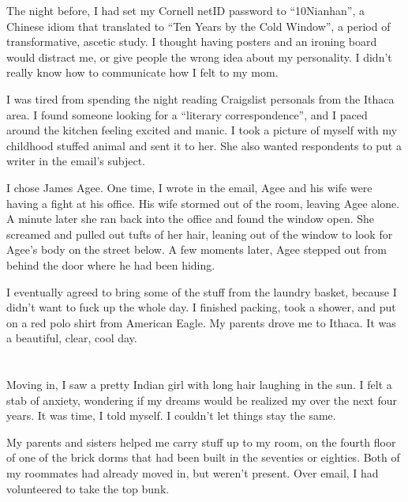 The night before, I had set my Cornell netID password to ``10Nianhan'', a
Chinese idiom that translated to ``Ten Years by the Cold Window'', a period of
transformative, ascetic study.  I thought having posters and an ironing board
would distract me, or give people the wrong idea about my personality.  I didn't
really know how to communicate how I felt to my mom.

I was tired from spending the night reading Craigslist personals from the Ithaca
area.  I found someone looking for a ``literary correspondence'', and I paced
around the kitchen feeling excited and manic.  I took a picture of myself with
my childhood stuffed animal and sent it to her.  She also wanted respondents to
put a writer in the email's subject.

I chose James Agee.  One time, I wrote in the email, Agee and his wife were
having a fight at his office.  His wife stormed out of the room, leaving Agee
alone.  A minute later she ran back into the office and found the window open.
She screamed and pulled out tufts of her hair, leaning out of the window to look
for Agee's body on the street below.  A few moments later, Agee stepped out from
behind the door where he had been hiding.

I eventually agreed to bring some of the stuff from the laundry basket, because
I didn't want to fuck up the whole day.  I finished packing, took a shower, and
put on a red polo shirt from American Eagle.  My parents drove me to Ithaca.  It
was a beautiful, clear, cool day.  

\section{}

Moving in, I saw a pretty Indian girl with long hair laughing in the sun.  I
felt a stab of anxiety, wondering if my dreams would be realized my over the
next four years.  It was time, I told myself.  I couldn't let things stay the
same.

My parents and sisters helped me carry stuff up to my room, on the fourth floor
of one of the brick dorms that had been built in the seventies or eighties.
Both of my roommates had already moved in, but weren't present.  Over email, I
had volunteered to take the top bunk.

\section{}

